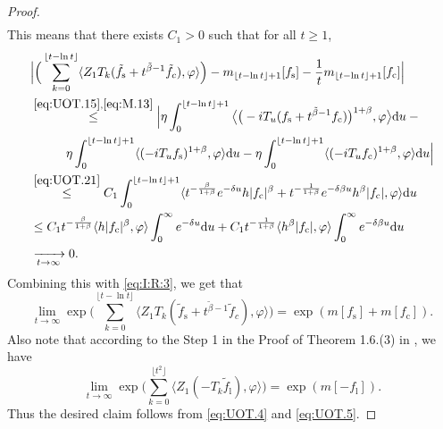 \documentclass[12pt,a4paper]{amsart}
\theoremstyle{plain}
\theoremstyle{definition}
\numberwithin{equation}{section}
\begin{document}
\begin{proof}
\begin{align}
\end{align}
This means that there exists $C_1 >0$ such that for all $t\geq 1$,
\begin{align}
&\Big|\Big(\sum_{k=0}^{\lfloor t-\ln t \rfloor} \langle Z_1T_{k}(\tilde f_\mathrm s+t^{\tilde{\beta}-1}\tilde{f}_c), \varphi\rangle \Big)-m_{\lfloor t-\ln t \rfloor+1}[f_\mathrm s]-\frac{1}{t}m_{\lfloor t-\ln t \rfloor+1}[f_\mathrm c]\Big|
\\& \begin{multlined}
\overset{\eqref{eq:UOT.15},\eqref{eq:M.13}}\leq\Big| \eta \int_0^{\lfloor t-\ln t \rfloor+1}\big\langle \big(-iT_u(f_\mathrm s+t^{\tilde{\beta}-1}f_\mathrm c)\big)^{1+\beta},\varphi \big\rangle \mathrm du - {}
\\ \eta \int_0^{\lfloor t-\ln t \rfloor+1} \langle (-iT_u f_\mathrm s)^{1+\beta}, \varphi \rangle  \mathrm du - \eta \int_0^{\lfloor t-\ln t \rfloor+1} \langle (-iT_u f_\mathrm c)^{1+\beta}, \varphi \rangle  \mathrm du\Big|
\end{multlined}
\\ & \overset{\eqref{eq:UOT.21}}\leq C_1\int_0^{\lfloor t-\ln t \rfloor+1}\langle t^{-\frac{\beta}{1+\beta}}e^{-\delta u}h|f_\mathrm c|^{\beta}+t^{-\frac{1}{1+\beta}}e^{-\delta\beta u}h^{\beta}|f_\mathrm c|, \varphi \rangle \mathrm du
\\& \leq C_1 t^{-\frac{\beta}{1+\beta}} \langle h|f_\mathrm c|^{\beta},\varphi \rangle \int_0^\infty e^{-\delta u} \mathrm du + C_1 t^{-\frac{1}{1+\beta}} \langle h^\beta|f_\mathrm c|,\varphi \rangle \int_0^\infty e^{-\delta \beta u} \mathrm du
\\& \xrightarrow[t\rightarrow \infty]{} 0.
\end{align}
Combining this with \eqref{eq:I:R:3}, we get that
\begin{equation} \label{eq:UOT.4}
\lim_{t\rightarrow \infty}\exp\Big(\sum_{k=0}^{\lfloor t-\ln t \rfloor} \langle Z_1T_{k}(\tilde f_\mathrm s+t^{\tilde{\beta}-1}\tilde{f}_c), \varphi\rangle \Big)  = \exp( m[f_\mathrm s]+m[f_\mathrm c]).
\end{equation}
Also note that according to the Step 1 in the Proof of Theorem 1.6.(3) in \cite{RenSongSunZhao2019Stable}, we have
\begin{equation}\label{eq:UOT.5}
\lim_{t\rightarrow \infty}\exp\Big(\sum_{k=0}^{\lfloor t^2 \rfloor}\langle Z_1(-T_k\tilde{f}_\mathrm l),\varphi\rangle\Big) =\exp(m[-f_\mathrm l]).
\end{equation}
Thus the desired claim follows from \eqref{eq:UOT.4} and \eqref{eq:UOT.5}.
\end{proof}
\end{document}
